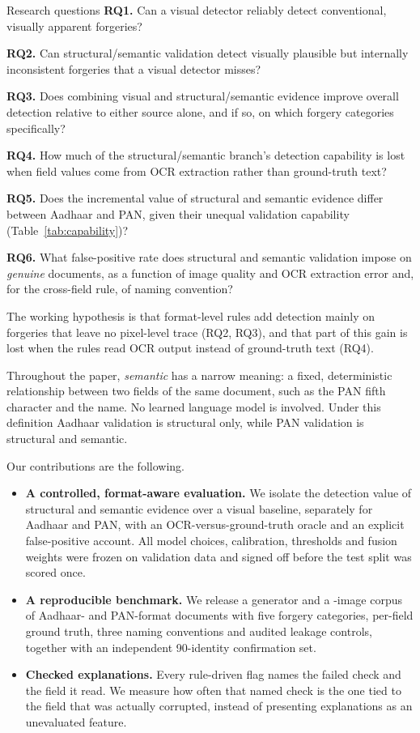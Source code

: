 \documentclass[12pt]{article}
\begin{document}
\begin{rqbox}{Research questions}
\textbf{RQ1.} Can a visual detector reliably detect conventional,
visually apparent forgeries?\par\smallskip
\textbf{RQ2.} Can structural/semantic validation detect visually
plausible but internally inconsistent forgeries that a visual detector
misses?\par\smallskip
\textbf{RQ3.} Does combining visual and structural/semantic evidence
improve overall detection relative to either source alone, and if so,
on which forgery categories specifically?\par\smallskip
\textbf{RQ4.} How much of the structural/semantic branch's detection
capability is lost when field values come from OCR extraction rather
than ground-truth text?\par\smallskip
\textbf{RQ5.} Does the incremental value of structural and semantic
evidence differ between Aadhaar and PAN, given their unequal validation
capability (Table~\ref{tab:capability})?\par\smallskip
\textbf{RQ6.} What false-positive rate does structural and semantic
validation impose on \emph{genuine} documents, as a function of image
quality and OCR extraction error and, for the cross-field rule, of
naming convention?
\end{rqbox}

The working hypothesis is that format-level rules add detection mainly on
forgeries that leave no pixel-level trace (RQ2, RQ3), and that part of
this gain is lost when the rules read OCR output instead of ground-truth
text (RQ4).

Throughout the paper, \emph{semantic} has a narrow meaning: a fixed,
deterministic relationship between two fields of the same document,
such as the PAN fifth character and the name. No learned language model
is involved. Under this definition Aadhaar validation is structural
only, while PAN validation is structural and semantic.

Our contributions are the following.
\begin{itemize}
\item \textbf{A controlled, format-aware evaluation.} We isolate the
detection value of structural and semantic evidence over a visual
baseline, separately for Aadhaar and PAN, with an OCR-versus-ground-truth
oracle and an explicit false-positive account. All model choices,
calibration, thresholds and fusion weights were frozen on validation
data and signed off before the test split was scored once.
\item \textbf{A reproducible benchmark.} We release a generator and a
\dsImages{}-image corpus of Aadhaar- and PAN-format documents with five
forgery categories, per-field ground truth, three naming conventions and
audited leakage controls, together with an independent 90-identity
confirmation set.
\item \textbf{Checked explanations.} Every rule-driven flag names the
failed check and the field it read. We measure how often that named
check is the one tied to the field that was actually corrupted, instead
of presenting explanations as an unevaluated feature.
\end{itemize}
\end{document}
